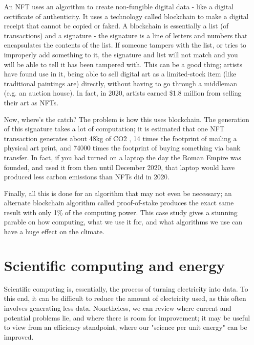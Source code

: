 \documentclass{article}
\begin{document}
An NFT uses an algorithm to create non-fungible digital data - like a digital certificate of authenticity. It uses a technology called blockchain to make a digital receipt that cannot be copied or faked. A blockchain is essentially a list (of transactions) and a signature - the signature is a line of letters and numbers that encapsulates the contents of the list. If someone tampers with the list, or tries to improperly add something to it, the signature and list will not match and you will be able to tell it has been tampered with.\citep{narayanan2017bitcoin} This can be a good thing; artists have found use in it, being able to sell digital art as a limited-stock item (like traditional paintings are) directly, without having to go through a middleman (e.g. an auction house). In fact, in 2020,  artists earned \$1.8 million \citep{redman2020NFT} from selling their art as NFTs.\newline

Now, where's the catch? The problem is how this uses blockchain. The generation of this signature takes a lot of computation; it is estimated that one NFT transaction generates about 48kg of CO2 \citep{atken2020unreasonable}, 14 times the footprint of mailing a physical art print, and 74000 times the footprint of buying something via bank transfer. \citep{qiu2021what} In fact, if you had turned on a laptop the day the Roman Empire was founded, and used it from then until December 2020, that laptop would have produced less carbon emissions than NFTs did in 2020. \citep{atken2020unreasonable} \newline

Finally, all this is done for an algorithm that may not even be necessary; an alternate blockchain algorithm called proof-of-stake produces the exact same result with only 1\% of the computing power. \citep{saleh2021blockchain} This case study gives a stunning parable on how computing, what we use it for, and what algorithms we use can have a huge effect on the climate.



\section{Scientific computing and energy}
Scientific computing is, essentially, the process of turning electricity into data. To this end, it can be difficult to reduce the amount of electricity used, as this often involves generating less data. Nonetheless, we can review where current and potential problems lie, and where there is room for improvement; it may be useful to view from an efficiency standpoint, where our "science per unit energy" can be improved.
\end{document}

